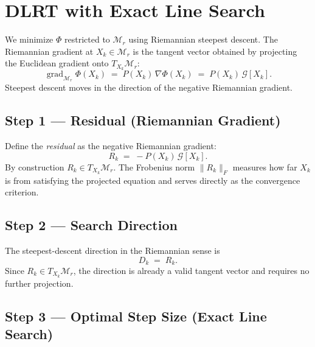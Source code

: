 \documentclass[12pt,a4paper]{article}
\newcommand{\cG}{\mathcal{G}}
\newcommand{\cM}{\mathcal{M}}
\begin{document}
\section{DLRT with Exact Line Search}

We minimize $\Phi$ restricted to $\cM_r$ using Riemannian steepest
descent.  The Riemannian gradient at $X_k \in \cM_r$ is the tangent vector
obtained by projecting the Euclidean gradient onto $T_{X_k}\cM_r$:
\begin{equation}
    \operatorname{grad}_{\cM_r}\Phi(X_k) \;=\; P(X_k)\,\nabla\Phi(X_k)
    \;=\; P(X_k)\,\cG[X_k].
\end{equation}
Steepest descent moves in the direction of the negative Riemannian gradient.

\subsection{Step 1 — Residual (Riemannian Gradient)}

Define the \emph{residual} as the negative Riemannian gradient:
\begin{equation}\label{eq:residual}
    \boxed{R_k \;=\; -P(X_k)\,\cG[X_k].}
\end{equation}
By construction $R_k \in T_{X_k}\cM_r$.  The Frobenius norm $\|R_k\|_F$
measures how far $X_k$ is from satisfying the projected equation and
serves directly as the convergence criterion.

\subsection{Step 2 — Search Direction}

The steepest-descent direction in the Riemannian sense is
\begin{equation}\label{eq:direction}
    \boxed{D_k \;=\; R_k.}
\end{equation}
Since $R_k \in T_{X_k}\cM_r$, the direction is already a valid tangent
vector and requires no further projection.

\subsection{Step 3 — Optimal Step Size (Exact Line Search)}
\end{document}
